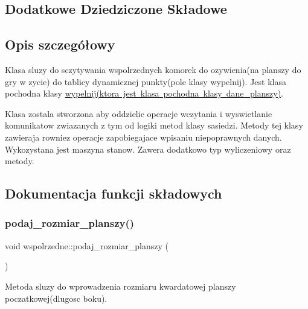 \subsection*{Dodatkowe Dziedziczone Składowe}


\subsection{Opis szczegółowy}
Klasa sluzy do sczytywania wspolrzednych komorek do ozywienia(na planszy do gry w zycie) do tablicy dynamicznej punkty(pole klasy wypelnij). Jest klasa pochodna klasy \mbox{\hyperlink{classwypelnij}{wypelnij(ktora jest klasa pochodna klasy dane\+\_\+planszy)}}.

Klasa zostala stworzona aby oddzielic operacje wczytania i wyswietlanie komunikatow zwiazanych z tym od logiki metod klasy sasiedzi. Metody tej klasy zawieraja rowniez operacje zapobiegajace wpisaniu niepoprawnych danych. Wykozystana jest maszyna stanow. Zawera dodatkowo typ wyliczeniowy oraz metody. 

\subsection{Dokumentacja funkcji składowych}
\mbox{\label{classwspolrzedne_a38c1a6012fac2575a2446ab094186114}} 
\subsubsection{\texorpdfstring{podaj\+\_\+rozmiar\+\_\+planszy()}{podaj\_rozmiar\_planszy()}}
{\footnotesize\ttfamily void wspolrzedne\+::podaj\+\_\+rozmiar\+\_\+planszy (\begin{DoxyParamCaption}{ }\end{DoxyParamCaption})}

Metoda sluzy do wprowadzenia rozmiaru kwardatowej planszy poczatkowej(dlugosc boku).


